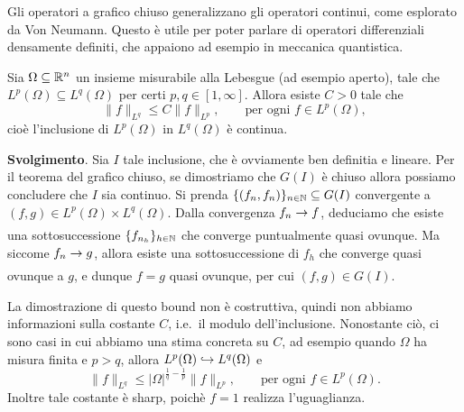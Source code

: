 Gli operatori a grafico chiuso generalizzano gli operatori continui, come esplorato da Von Neumann. Questo è utile per poter parlare di operatori differenziali densamente definiti, che appaiono ad esempio in meccanica quantistica.

	\begin{exercise}
	Sia $\Omega \subseteq \mathbb{R}^n$ un insieme misurabile alla Lebesgue (ad esempio aperto), tale che $L^p(\Omega) \subseteq L^q(\Omega)$ per certi $p,q \in [1, \infty]$.
	Allora esiste $C > 0$ tale che
	\begin{equation*}
		\|f\|_{L^q} \leq C\|f\|_{L^p}, \qquad \text{per ogni $f \in L^p(\Omega)$},
	\end{equation*}
	cioè l'inclusione di $L^p(\Omega)$ in $L^q(\Omega)$ è continua.

	\noindent\textbf{Svolgimento}. Sia $I$ tale inclusione, che è ovviamente ben definitia e lineare. Per il teorema del grafico chiuso, se dimostriamo che $G(I)$ è chiuso allora possiamo concludere che $I$ sia continuo.
	Si prenda $\{(f_n, f_n)\}_{n \in \mathbb{N}} \subseteq G(I)$ convergente a $(f,g) \in L^p(\Omega) \times L^q(\Omega)$. Dalla convergenza $f_n \underset{{}}{\rightarrow} f$, deduciamo che esiste una sottosuccessione $\{f_{n_h}\}_{h \in \mathbb{N}}$ che converge puntualmente quasi ovunque. Ma siccome $f_n \underset{{}}{\rightarrow} g$, allora esiste una sottosuccessione di $f_h$ che converge quasi ovunque a $g$, e dunque $f = g$ quasi ovunque, per cui $(f,g) \in G(I)$.
\end{exercise}

\begin{remark}
	La dimostrazione di questo bound non è costruttiva, quindi non abbiamo informazioni sulla costante $C$, i.e.\ il modulo dell'inclusione. Nonostante ciò, ci sono casi in cui abbiamo una stima concreta su $C$, ad esempio quando $\Omega$ ha misura finita e $p > q$, allora $L^p(\Omega) \hookrightarrow L^q(\Omega)$ e
	\begin{equation*}
		\|f\|_{L^q} \leq |\Omega|^{\frac1q - \frac1p}\|f\|_{L^p}, \qquad \text{per ogni $f \in L^p(\Omega)$}.
	\end{equation*}
	Inoltre tale costante è sharp, poichè $f=1$ realizza l'uguaglianza.
\end{remark}

